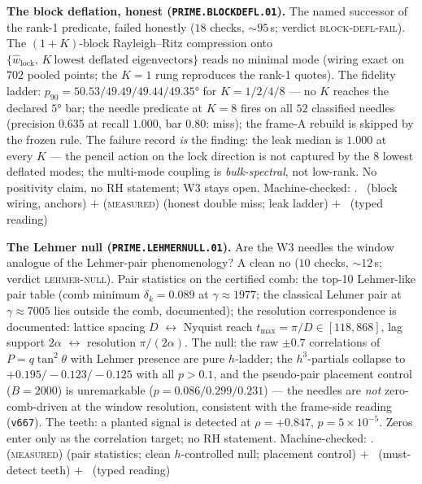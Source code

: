 \documentclass[11pt,a4paper]{article}
\theoremstyle{definition}
\begin{document}
\par\smallskip\noindent\textbf{The block deflation, honest
(\texttt{PRIME.BLOCKDEFL.01}).}
The named successor of the rank-1 predicate, failed honestly ($18$
checks, ${\sim}95$\,s; verdict \textsc{block-defl-fail}).  The
$(1{+}K)$-block Rayleigh--Ritz compression onto
$\{\hat w_{\mathrm{lock}},\,K\ \text{lowest deflated eigenvectors}\}$
reads no minimal mode (wiring exact on $702$ pooled points; the
$K=1$ rung reproduces the rank-1 quotes).  The fidelity ladder:
$p_{90}=50.53/49.49/49.44/49.35°$ for $K=1/2/4/8$ --- no $K$ reaches
the declared $5°$ bar; the needle predicate at $K=8$ fires on all
$52$ classified needles (precision $0.635$ at recall $1.000$, bar
$0.80$: miss); the frame-A rebuild is skipped by the frozen rule.
The failure record \emph{is} the finding: the leak median is $1.000$
at every $K$ --- the pencil action on the lock direction is not
captured by the $8$ lowest deflated modes; the multi-mode coupling
is \emph{bulk-spectral}, not low-rank.  No positivity claim, no RH
statement; W3 stays open.
Machine-checked: .
\mE\ (block wiring, anchors) $+$ (\textsc{measured}) (honest double
miss; leak ladder) $+$ \mC\ (typed reading)
\par\smallskip

\par\smallskip\noindent\textbf{The Lehmer null
(\texttt{PRIME.LEHMERNULL.01}).}
Are the W3 needles the window analogue of the Lehmer-pair
phenomenology?  A clean no ($10$ checks, ${\sim}12$\,s; verdict
\textsc{lehmer-null}).  Pair statistics on the certified comb: the
top-10 Lehmer-like pair table (comb minimum $\delta_k=0.089$ at
$\gamma\approx1977$; the classical Lehmer pair at
$\gamma\approx7005$ lies outside the comb, documented); the
resolution correspondence is documented: lattice spacing $D$
$\leftrightarrow$ Nyquist reach $t_{\max}=\pi/D\in[118,868]$, lag
support $2\alpha$ $\leftrightarrow$ resolution $\pi/(2\alpha)$.  The
null: the raw $\pm0.7$ correlations of $P=q\tan^2\theta$ with Lehmer
presence are pure $h$-ladder; the $h^3$-partials collapse to
$+0.195/-0.123/-0.125$ with all $p>0.1$, and the pseudo-pair
placement control ($B=2000$) is unremarkable ($p=0.086/0.299/0.231$)
--- the needles are \emph{not} zero-comb-driven at the window
resolution, consistent with the frame-side reading (\texttt{v667}).
The teeth: a planted signal is detected at $\rho=+0.847$,
$p=5\times10^{-5}$.  Zeros enter only as the correlation target; no
RH statement.
Machine-checked: .
(\textsc{measured}) (pair statistics; clean $h$-controlled null;
placement control) $+$ \mE\ (must-detect teeth) $+$ \mC\ (typed
reading)
\par\smallskip
\end{document}
